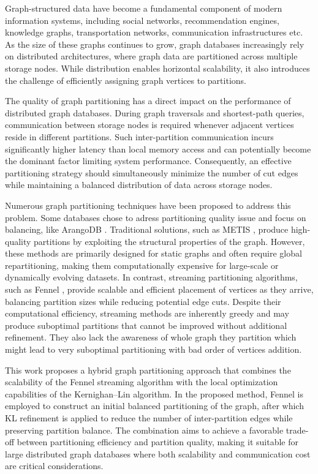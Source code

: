 Graph-structured data have become a fundamental component of modern information systems, including social networks, recommendation engines, knowledge graphs, transportation networks, communication infrastructures etc. As the size of these graphs continues to grow, graph databases increasingly rely on distributed architectures, where graph data are partitioned across multiple storage nodes. While distribution enables horizontal scalability, it also introduces the challenge of efficiently assigning graph vertices to partitions.

The quality of graph partitioning has a direct impact on the performance of distributed graph databases. During graph traversals and shortest-path queries, communication between storage nodes is required whenever adjacent vertices reside in different partitions. Such inter-partition communication incurs significantly higher latency than local memory access and can potentially become the dominant factor limiting system performance. Consequently, an effective partitioning strategy should simultaneously minimize the number of cut edges while maintaining a balanced distribution of data across storage nodes.

Numerous graph partitioning techniques have been proposed to address this problem. Some databases chose to adress partitioning quality issue and focus on balancing, like ArangoDB \cite{arangodb_github}. Traditional solutions, such as METIS \cite{MetisOG}, produce high-quality partitions by exploiting the structural properties of the graph. However, these methods are primarily designed for static graphs and often require global repartitioning, making them computationally expensive for large-scale or dynamically evolving datasets. In contrast, streaming partitioning algorithms, such as Fennel \cite{Fennel}, provide scalable and efficient placement of vertices as they arrive, balancing partition sizes while reducing potential edge cuts. Despite their computational efficiency, streaming methods are inherently greedy and may produce suboptimal partitions that cannot be improved without additional refinement. They also lack the awareness of whole graph they partition which might lead to very suboptimal partitioning with bad order of vertices addition.

This work proposes a hybrid graph partitioning approach that combines the scalability of the Fennel streaming algorithm with the local optimization capabilities of the Kernighan–Lin algorithm. In the proposed method, Fennel is employed to construct an initial balanced partitioning of the graph, after which KL refinement is applied to reduce the number of inter-partition edges while preserving partition balance. The combination aims to achieve a favorable trade-off between partitioning efficiency and partition quality, making it suitable for large distributed graph databases where both scalability and communication cost are critical considerations.


